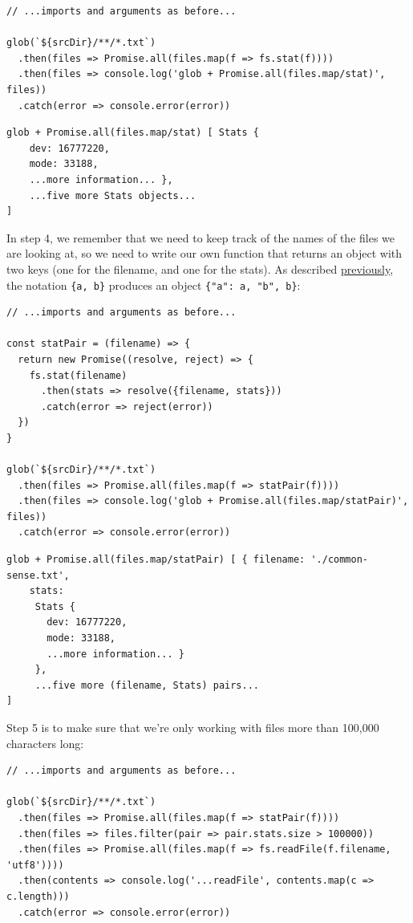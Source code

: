 \begin{verbatim}
// ...imports and arguments as before...

glob(`${srcDir}/**/*.txt`)
  .then(files => Promise.all(files.map(f => fs.stat(f))))
  .then(files => console.log('glob + Promise.all(files.map/stat)', files))
  .catch(error => console.error(error))
\end{verbatim}

\begin{verbatim}
glob + Promise.all(files.map/stat) [ Stats {
    dev: 16777220,
    mode: 33188,
    ...more information... },
    ...five more Stats objects...
]
\end{verbatim}

In step 4, we remember that we need to keep track of the names of the
files we are looking at, so we need to write our own function that
returns an object with two keys (one for the filename, and one for the
stats). As described \protect\hyperlink{s:pages}{previously}, the
notation \texttt{\{a,\ b\}} produces an object
\texttt{\{"a":\ a,\ "b",\ b\}}:

\begin{verbatim}
// ...imports and arguments as before...

const statPair = (filename) => {
  return new Promise((resolve, reject) => {
    fs.stat(filename)
      .then(stats => resolve({filename, stats}))
      .catch(error => reject(error))
  })
}

glob(`${srcDir}/**/*.txt`)
  .then(files => Promise.all(files.map(f => statPair(f))))
  .then(files => console.log('glob + Promise.all(files.map/statPair)', files))
  .catch(error => console.error(error))
\end{verbatim}

\begin{verbatim}
glob + Promise.all(files.map/statPair) [ { filename: './common-sense.txt',
    stats:
     Stats {
       dev: 16777220,
       mode: 33188,
       ...more information... }
     },
     ...five more (filename, Stats) pairs...
]
\end{verbatim}

Step 5 is to make sure that we're only working with files more than
100,000 characters long:

\begin{verbatim}
// ...imports and arguments as before...

glob(`${srcDir}/**/*.txt`)
  .then(files => Promise.all(files.map(f => statPair(f))))
  .then(files => files.filter(pair => pair.stats.size > 100000))
  .then(files => Promise.all(files.map(f => fs.readFile(f.filename, 'utf8'))))
  .then(contents => console.log('...readFile', contents.map(c => c.length)))
  .catch(error => console.error(error))
\end{verbatim}

